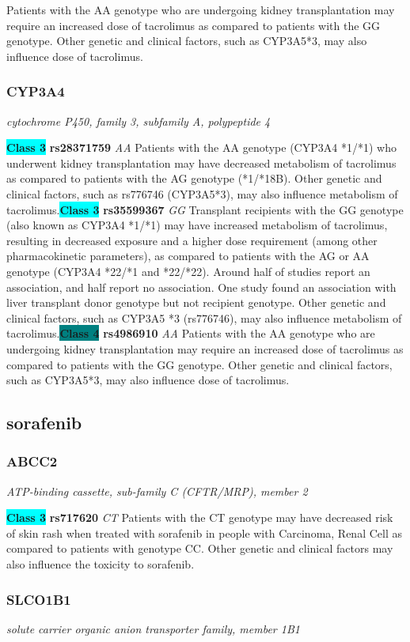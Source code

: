 \documentclass{report}
\begin{document}
Patients with the AA genotype who are undergoing kidney transplantation may require an increased dose of tacrolimus as compared to patients with the GG genotype. Other genetic and clinical factors, such as CYP3A5*3, may also influence dose of tacrolimus.\newline\subsubsection{ CYP3A4 }
\textit{ cytochrome P450, family 3, subfamily A, polypeptide 4 }

\textbf{\colorbox{cyan} {Class 3}} \textbf{ rs28371759 } \textit{ AA }
Patients with the AA genotype (CYP3A4 *1/*1) who underwent kidney transplantation may have decreased metabolism of tacrolimus as compared to patients with the AG genotype (*1/*18B). Other genetic and clinical factors, such as rs776746 (CYP3A5*3), may also influence metabolism of tacrolimus.\newline\textbf{\colorbox{cyan} {Class 3}} \textbf{ rs35599367 } \textit{ GG }
Transplant recipients with the GG genotype (also known as CYP3A4 *1/*1) may have increased metabolism of tacrolimus, resulting in decreased exposure and a higher dose requirement (among other pharmacokinetic parameters), as compared to patients with the AG or AA genotype (CYP3A4 *22/*1 and *22/*22). Around half of studies report an association, and half report no association. One study found an association with liver transplant donor genotype but not recipient genotype. Other genetic and clinical factors, such as CYP3A5 *3 (rs776746), may also influence metabolism of tacrolimus.\newline\textbf{\colorbox{teal} {Class 4}} \textbf{ rs4986910 } \textit{ AA }
Patients with the AA genotype who are undergoing kidney transplantation may require an increased dose of tacrolimus as compared to patients with the GG genotype. Other genetic and clinical factors, such as CYP3A5*3, may also influence dose of tacrolimus.\newline\subsection{ sorafenib }\subsubsection{ ABCC2 }
\textit{ ATP-binding cassette, sub-family C (CFTR/MRP), member 2 }

\textbf{\colorbox{cyan} {Class 3}} \textbf{ rs717620 } \textit{ CT }
Patients with the CT genotype may have decreased risk of skin rash when treated with sorafenib in people with Carcinoma, Renal Cell as compared to patients with genotype CC. Other genetic and clinical factors may also influence the toxicity to sorafenib.\newline\subsubsection{ SLCO1B1 }
\textit{ solute carrier organic anion transporter family, member 1B1 }
\end{document}
